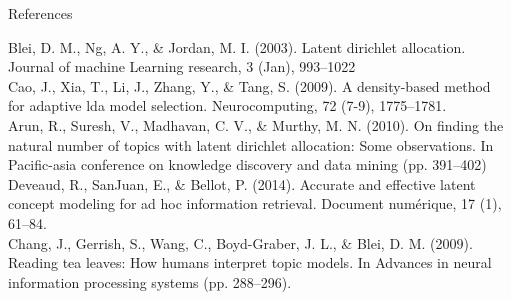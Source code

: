 \documentclass[fleqn,final]{beamer}
\begin{document}
\begin{frame}
\begin{block}{References}
{\footnotesize

\noindent [1]  Blei, D. M., Ng, A. Y., \& Jordan, M. I. (2003). Latent dirichlet allocation. Journal of machine Learning research, 3 (Jan), 993–1022\\

\noindent [2] Cao, J., Xia, T., Li, J., Zhang, Y., \& Tang, S. (2009). A density-based method for adaptive lda model selection. Neurocomputing, 72 (7-9), 1775–1781.\\

\noindent [3] Arun, R., Suresh, V., Madhavan, C. V., \& Murthy, M. N. (2010). On finding the natural number of topics with latent dirichlet allocation: Some observations. In Pacific-asia conference on knowledge discovery and data mining (pp. 391–402)\\

\noindent [4] Deveaud, R., SanJuan, E., \& Bellot, P. (2014). Accurate and effective latent concept modeling for ad hoc information retrieval. Document numérique, 17 (1), 61–84.\\

\noindent [5] Chang, J., Gerrish, S., Wang, C., Boyd-Graber, J. L., \& Blei, D. M. (2009). Reading tea leaves: How humans interpret topic models. In Advances in neural information processing systems (pp. 288–296).\\




}


\end{block}

\end{frame}
\end{document}
